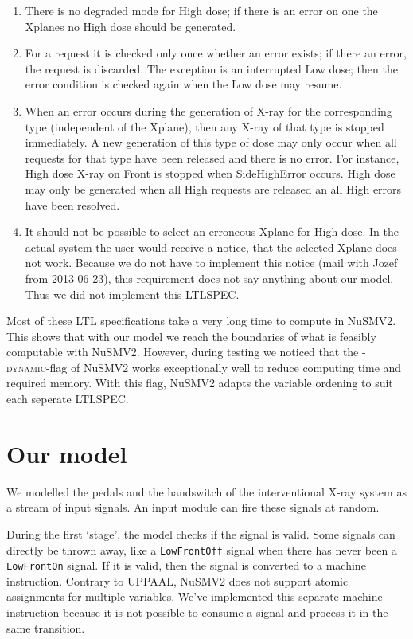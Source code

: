\documentclass[a4paper,10pt]{article}
\begin{document}
\begin{enumerate}
\begin{enumerate}
			\end{enumerate}
		\item There is no degraded mode for High dose; if there is an error on one the Xplanes no High dose should be generated.
		\item For a request it is checked only once whether an error exists; if there an error, the request is discarded. The exception is an interrupted Low dose; then the error condition is checked again when the Low dose may resume.
		\item
			When an error occurs during the generation of X-ray for the corresponding type (independent of the Xplane), then any X-ray of that type is stopped immediately.
			A new generation of this type of dose may only occur when all requests for that type have been released and there is no error.
			For instance, High dose X-ray on Front is stopped when SideHighError occurs.
			High dose may only be generated when all High requests are released an all High errors have been resolved.
		\item It should not be possible to select an erroneous Xplane for High dose.
			In the actual system the user would receive a notice, that the selected Xplane does not work.
			Because we do not have to implement this notice (mail with Jozef from 2013-06-23), this requirement does not say anything about our model.
			Thus we did not implement this LTLSPEC.
	\end{enumerate}
	
	Most of these LTL specifications take a very long time to compute in NuSMV2.
	This shows that with our model we reach the boundaries of what is feasibly computable with NuSMV2.
	However, during testing we noticed that the \textsc{-dynamic}-flag of NuSMV2 works exceptionally well to reduce computing time and required memory.
	With this flag, NuSMV2 adapts the variable ordening to suit each seperate LTLSPEC.
	
	\section{Our model}
	We modelled the pedals and the handswitch of the interventional X-ray system as a stream of input signals.
	An input module can fire these signals at random.
	
	During the first `stage', the model checks if the signal is valid.
	Some signals can directly be thrown away, like a \texttt{LowFrontOff} signal when there has never been a \texttt{LowFrontOn} signal.
	If it is valid, then the signal is converted to a machine instruction.
	Contrary to UPPAAL, NuSMV2 does not support atomic assignments for multiple variables.
	We've implemented this separate machine instruction because it is not possible to consume a signal and process it in the same transition.
	
\end{document}
